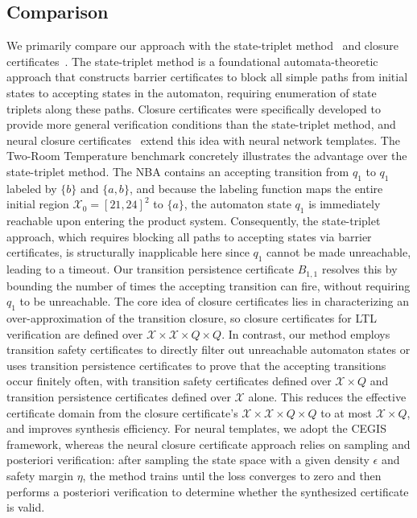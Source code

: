 \subsection{Comparison}
We primarily compare our approach with the state-triplet method~\cite{wongpiromsarn2015automata} and closure certificates~\cite{murali2024closure}. The state-triplet method is a foundational automata-theoretic approach that constructs barrier certificates to block all simple paths from initial states to accepting states in the automaton, requiring enumeration of state triplets along these paths. Closure certificates were specifically developed to provide more general verification conditions than the state-triplet method, and neural closure certificates~\cite{nadali2024neural} extend this idea with neural network templates. The Two-Room Temperature benchmark concretely illustrates the advantage over the state-triplet method. The NBA contains an accepting transition from $q_1$ to $q_1$ labeled by $\{b\}$ and $\{a,b\}$, and because the labeling function maps the entire initial region $\mathcal{X}_0=[21,24]^2$ to $\{a\}$, the automaton state $q_1$ is immediately reachable upon entering the product system. Consequently, the state-triplet approach, which requires blocking all paths to accepting states via barrier certificates, is structurally inapplicable here since $q_1$ cannot be made unreachable, leading to a timeout. Our transition persistence certificate $B_{1,1}$ resolves this by bounding the number of times the accepting transition can fire, without requiring $q_1$ to be unreachable. The core idea of closure certificates lies in characterizing an over-approximation of the transition closure, so closure certificates for LTL verification are defined over $\mathcal{X} \times \mathcal{X} \times Q \times Q$. In contrast, our method employs transition safety certificates to directly filter out unreachable automaton states or uses transition persistence certificates to prove that the accepting transitions occur finitely often, with transition safety certificates defined over $\mathcal{X} \times Q$ and transition persistence certificates defined over $\mathcal{X}$ alone. This reduces the effective certificate domain from the closure certificate's $\mathcal{X} \times \mathcal{X} \times Q \times Q$ to at most $\mathcal{X} \times Q$, and improves synthesis efficiency. For neural templates, we adopt the CEGIS framework, whereas the neural closure certificate approach relies on sampling and posteriori verification: after sampling the state space with a given density $\epsilon$ and safety margin $\eta$, the method trains until the loss converges to zero and then performs a posteriori verification to determine whether the synthesized certificate is valid.

